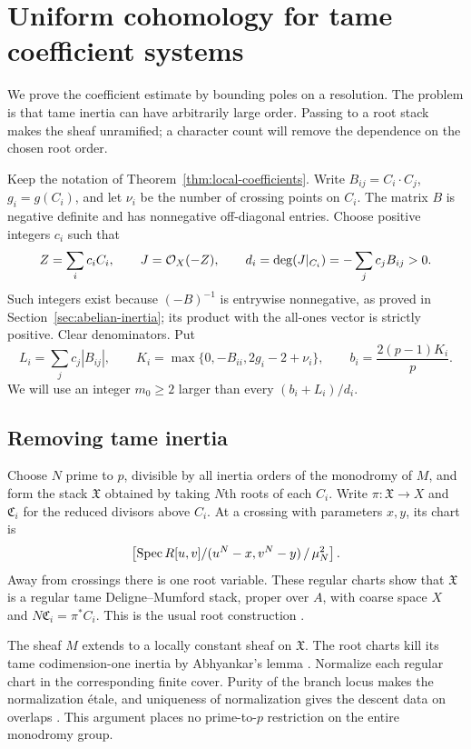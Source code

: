 \section{Uniform cohomology for tame coefficient systems}\label{sec:tame-coefficients}

We prove the coefficient estimate by bounding poles on a resolution. The problem is that tame inertia can have arbitrarily large order. Passing to a root stack makes the sheaf unramified; a character count will remove the dependence on the chosen root order.

Keep the notation of Theorem~\ref{thm:local-coefficients}. Write $B_{ij}=C_i\cdot C_j$, $g_i=g(C_i)$, and let $\nu_i$ be the number of crossing points on $C_i$. The matrix $B$ is negative definite \cite[Lemma 14.1, p.~224]{Lipman} and has nonnegative off-diagonal entries. Choose positive integers $c_i$ such that
\[
 Z=\sum_i c_iC_i,\qquad J=\mathcal O_X(-Z),\qquad
 d_i=\deg(J|_{C_i})=-\sum_jc_jB_{ij}>0.
\]
Such integers exist because $(-B)^{-1}$ is entrywise nonnegative, as proved in Section~\ref{sec:abelian-inertia}; its product with the all-ones vector is strictly positive. Clear denominators. Put
\begin{equation}\label{eq:resolution-constants}
 L_i=\sum_jc_j|B_{ij}|,\qquad
 K_i=\max\{0,-B_{ii},2g_i-2+\nu_i\},\qquad
 b_i=\frac{2(p-1)K_i}{p}.
\end{equation}
We will use an integer $m_0\geq2$ larger than every $(b_i+L_i)/d_i$.

\subsection{Removing tame inertia}

Choose $N$ prime to $p$, divisible by all inertia orders of the monodromy of $M$, and form the stack $\mathfrak X$ obtained by taking $N$th roots of each $C_i$. Write $\pi:\mathfrak X\to X$ and $\mathfrak C_i$ for the reduced divisors above $C_i$. At a crossing with parameters $x,y$, its chart is
\[
 \left[\operatorname{Spec} R[u,v]/(u^N-x,v^N-y)\,/\,\mu_N^2\right].
\]
Away from crossings there is one root variable. These regular charts show that $\mathfrak X$ is a regular tame Deligne--Mumford stack, proper over $A$, with coarse space $X$ and $N\mathfrak C_i=\pi^*C_i$. This is the usual root construction \cite[\S\S2.3--2.4, author pp.~7--10]{Cadman}.

The sheaf $M$ extends to a locally constant sheaf on $\mathfrak X$. The root charts kill its tame codimension-one inertia by Abhyankar's lemma \cite[Expos\'e XIII, Proposition 5.2, original pp.~428--429]{SGA1}. Normalize each regular chart in the corresponding finite cover. Purity of the branch locus makes the normalization \'etale, and uniqueness of normalization gives the descent data on overlaps \cite[Tags 0BRM and 0BMB]{Stacks}. This argument places no prime-to-$p$ restriction on the entire monodromy group.

